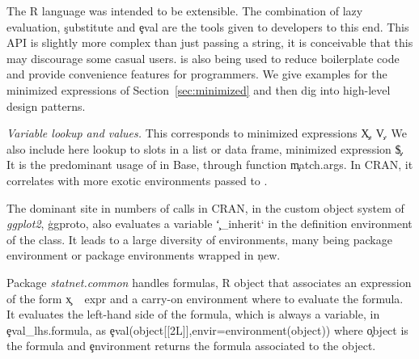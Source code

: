 \documentclass[review,screen,acmsmall,anonymous=true]{acmart}
\newcommand{\mypara}[1]{\medskip\noindent\emph{#1}\xspace}
\begin{document}




The R language was intended to be extensible. The combination of lazy
evaluation, \c{substitute} and \c{eval} are the tools given to
developers to this end. This API is slightly more complex than just
passing a string, it is conceivable that this may discourage some
casual users. \Eval is also being used to reduce boilerplate code and
provide convenience features for programmers. We give examples for the minimized expressions of Section~\ref{sec:minimized} and then dig into high-level \eval design patterns.

\mypara{Variable lookup and values.} 
This corresponds to minimized expressions \c{X}, \c{V}. We also include here lookup to slots in a list or data frame, \ie minimized expression \c{\$}.
It is the predominant usage of \eval in Base, through function \c{match.args}. In CRAN, it correlates with more exotic environments passed to \eval. 

The dominant site in numbers of calls in CRAN, in the custom object system of \emph{ggplot2}, \c{ggproto}, also evaluates a variable \c{`\_inherit`} in the definition environment of the class. It leads to a large diversity of environments, many being package environment or package environments wrapped in \c{new}.

Package \emph{statnet.common} handles formulas, R object that associates an expression of the form \c{x ~ expr} and a carry-on environment where to evaluate the formula. It evaluates the left-hand side of the formula, which is always a variable, in \c{eval\_lhs.formula}, as \c{eval(object[[2L]],envir=environment(object))} where \c{object} is the formula and \c{environment} returns the formula associated to the object.
\end{document}
